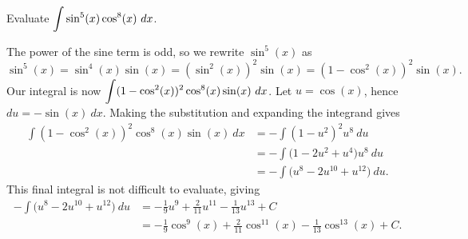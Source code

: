 \begin{example} \label{eg:5.2.1} %
Evaluate $\displaystyle\int\sin^5(x)\cos^8(x)\ dx$.

\solution The power of the sine term is odd, so we rewrite $\sin^5(x)$ as 
$$\sin^5(x) = \sin^4(x)\sin(x) = (\sin^2(x))^2\sin(x) = (1-\cos^2(x))^2\sin(x).$$
Our integral is now $\displaystyle \int (1-\cos^2(x))^2\cos^8(x)\sin(x)\ dx$. Let $u = \cos(x)$, hence $du = -\sin(x)\ dx$. Making the substitution and expanding the integrand gives
\begin{align*}
\int (1-\cos^2(x))^2\cos^8(x)\sin(x)\ dx &= -\int (1-u^2)^2u^8\ du \\
& = -\int \big(1-2u^2+u^4\big)u^8\ du \\
&= -\int \big(u^8-2u^{10}+u^{12}\big)\ du.
\end{align*}
This final integral is not difficult to evaluate, giving 
\begin{align*} -\int \big(u^8-2u^{10}+u^{12}\big)\ du &= -\frac19u^9 + \frac2{11}u^{11} - \frac1{13}u^{13} + C \\
										&=-\frac19\cos^9(x) + \frac2{11}\cos^{11}(x) - \frac1{13}\cos^{13}(x) + C.
\end{align*}
\end{example}